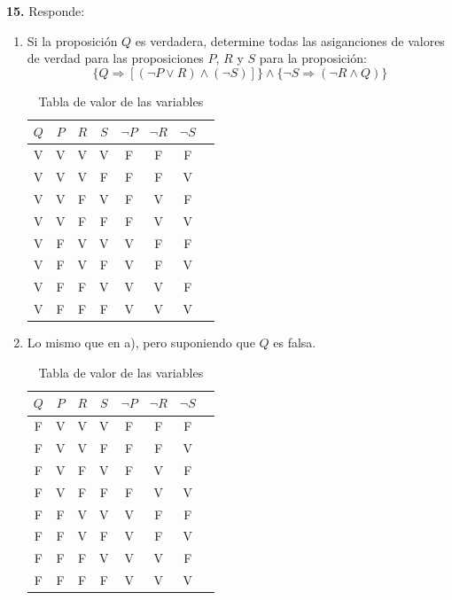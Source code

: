 \documentclass[12pt]{article}
\begin{document}
%
%
\textbf{15.} Responde:

\begin{enumerate}[label=\alph*)]
    \item Si la proposición $Q$ es verdadera, determine todas las asiganciones de valores de
    verdad para las proposiciones $P$, $R$ y $S$ para la proposición:
    \[\{Q \Longrightarrow [(\neg P \lor R) \land (\neg S)]\} \land \{\neg S \Longrightarrow (\neg R \land Q)\}\]
    \begin{table}[h!]
        \centering
        \begin{tabular}{|c|c|c|c|c|c|c|c|}
            \hline
            $Q$ & $P$ & $R$ & $S$ & $\neg P$ & $\neg R$ & $\neg S$\\
            \hline
            V & V & V & V & F & F & F\\
            V & V & V & F & F & F & V\\
            V & V & F & V & F & V & F\\
            V & V & F & F & F & V & V\\
            V & F & V & V & V & F & F\\
            V & F & V & F & V & F & V\\
            V & F & F & V & V & V & F\\
            V & F & F & F & V & V & V\\ 
            \hline           
        \end{tabular}
        \caption{Tabla de valor de las variables}
    \end{table}
    \newpage

        \item Lo mismo que en a), pero suponiendo que $Q$ es falsa.\\
        \begin{table}[h!]
            \centering
            \begin{tabular}{|c|c|c|c|c|c|c|c|}
                \hline
                $Q$ & $P$ & $R$ & $S$ & $\neg P$ & $\neg R$ & $\neg S$\\
                \hline
                F & V & V & V & F & F & F\\
                F & V & V & F & F & F & V\\
                F & V & F & V & F & V & F\\
                F & V & F & F & F & V & V\\
                F & F & V & V & V & F & F\\
                F & F & V & F & V & F & V\\
                F & F & F & V & V & V & F\\
                F & F & F & F & V & V & V\\ 
                \hline           
            \end{tabular}
            \caption{Tabla de valor de las variables}
        \end{table}
\end{enumerate}
\end{document}
